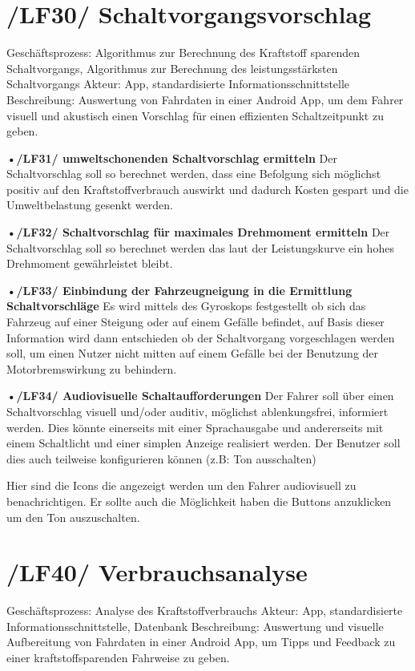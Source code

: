 \section{/LF30/ Schaltvorgangsvorschlag}
Geschäftsprozess:	Algorithmus zur Berechnung des Kraftstoff sparenden Schaltvorgangs, Algorithmus zur Berechnung des leistungsstärksten Schaltvorgangs
Akteur:			App, standardisierte Informationsschnittstelle
Beschreibung:	Auswertung von Fahrdaten in einer Android App, um dem Fahrer visuell und akustisch einen Vorschlag für einen effizienten Schaltzeitpunkt zu geben. 

\textbf{•/LF31/ umweltschonenden Schaltvorschlag ermitteln}
Der Schaltvorschlag soll so berechnet werden, dass eine Befolgung sich möglichst positiv auf den Kraftstoffverbrauch auswirkt und dadurch Kosten gespart und die Umweltbelastung gesenkt werden.

\textbf{•/LF32/ Schaltvorschlag für maximales Drehmoment ermitteln}
Der Schaltvorschlag soll so berechnet werden das laut der Leistungskurve ein hohes Drehmoment gewährleistet bleibt. 

\textbf{•/LF33/ Einbindung der Fahrzeugneigung in die Ermittlung Schaltvorschläge }
Es wird mittels des Gyroskops festgestellt ob sich das Fahrzeug auf einer Steigung oder auf einem Gefälle befindet, auf Basis dieser Information wird dann entschieden ob der Schaltvorgang vorgeschlagen werden soll, um einen Nutzer nicht mitten auf einem Gefälle bei der Benutzung der Motorbremswirkung zu behindern. 

\textbf{•/LF34/ Audiovisuelle Schaltaufforderungen}
Der Fahrer soll über einen Schaltvorschlag visuell und/oder auditiv, möglichst ablenkungsfrei, informiert werden. Dies könnte einerseits mit einer Sprachausgabe und andererseits mit einem Schaltlicht und einer simplen Anzeige realisiert werden. Der Benutzer soll dies auch teilweise konfigurieren können (z.B: Ton ausschalten)

Hier sind die Icons die angezeigt werden um den Fahrer audiovisuell zu benachrichtigen.                                                                    Er sollte auch die Möglichkeit haben die Buttons anzuklicken um den Ton auszuschalten. 

\section{/LF40/ Verbrauchsanalyse}
Geschäftsprozess:	Analyse des Kraftstoffverbrauchs
Akteur:			App, standardisierte Informationsschnittstelle, Datenbank
Beschreibung:	Auswertung und visuelle Aufbereitung von Fahrdaten in einer Android App, um Tipps und Feedback zu einer kraftstoffsparenden Fahrweise zu geben.


